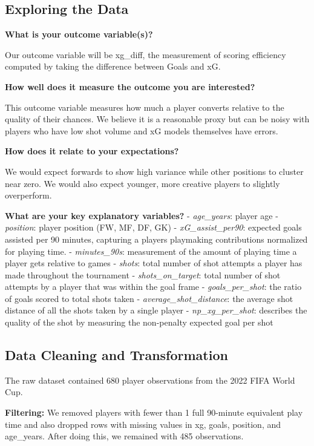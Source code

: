 \documentclass[
  letterpaper,
  DIV=11,
  numbers=noendperiod]{scrartcl}
\begin{document}
\subsection{Exploring the Data}\label{exploring-the-data}

\textbf{What is your outcome variable(s)?}

Our outcome variable will be xg\_diff, the measurement of scoring
efficiency computed by taking the difference between Goals and xG.

\textbf{How well does it measure the outcome you are interested?}

This outcome variable measures how much a player converts relative to
the quality of their chances. We believe it is a reasonable proxy but
can be noisy with players who have low shot volume and xG models
themselves have errors.

\textbf{How does it relate to your expectations?}

We would expect forwards to show high variance while other positions to
cluster near zero. We would also expect younger, more creative players
to slightly overperform.

\textbf{What are your key explanatory variables?} - \emph{age\_years}:
player age - \emph{position}: player position (FW, MF, DF, GK) -
\emph{xG\_assist\_per90}: expected goals assisted per 90 minutes,
capturing a players playmaking contributions normalized for playing
time. - \emph{minutes\_90s}: measurement of the amount of playing time a
player gets relative to games - \emph{shots}: total number of shot
attempts a player has made throughout the tournament -
\emph{shots\_on\_target}: total number of shot attempts by a player that
was within the goal frame - \emph{goals\_per\_shot}: the ratio of goals
scored to total shots taken - \emph{average\_shot\_distance}: the
average shot distance of all the shots taken by a single player -
\emph{np\_xg\_per\_shot}: describes the quality of the shot by measuring
the non-penalty expected goal per shot

\subsection{Data Cleaning and
Transformation}\label{data-cleaning-and-transformation}

The raw dataset contained 680 player observations from the 2022 FIFA
World Cup.

\textbf{Filtering:} We removed players with fewer than 1 full 90-minute
equivalent play time and also dropped rows with missing values in xg,
goals, position, and age\_years. After doing this, we remained with 485
observations.
\end{document}
